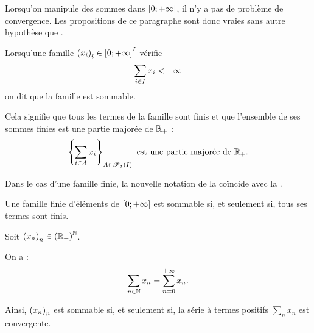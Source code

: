 \begin{rem}
Lorsqu'on manipule des sommes dans \(\left[0;+\infty\right]\), il n'y a pas de problème de convergence. Les propositions de ce paragraphe sont donc vraies sans autre hypothèse que .

Lorsqu'une famille \(\left(x_i\right)_i\in\left[0;+\infty\right]^I\) vérifie \[\sum_{i\in I}x_i<+\infty\] on dit que la famille est sommable.

Cela signifie que tous les termes de la famille sont finis et que l'ensemble de ses sommes finies est une partie majorée de \(\mathbb{R}_+\) : \[\left\lbrace\sum_{i\in A}x_i\right\rbrace_{A\in\mathscr{P}_f\left(I\right)}\text{ est une partie majorée de }\mathbb{R}_+.\]
\end{rem}

\begin{ex}
Dans le cas d'une famille finie, la nouvelle notation de la  coïncide avec la .

Une famille finie d'éléments de \(\left[0;+\infty\right]\) est sommable si, et seulement si, tous ses termes sont finis.
\end{ex}

\begin{ex}
Soit \(\left(x_n\right)_n\in\left(\mathbb{R}_+\right)^{\mathbb{N}}\).

On a : \[\sum_{n\in\mathbb{N}}x_n=\sum_{n=0}^{+\infty}x_n.\]

Ainsi, \(\left(x_n\right)_n\) est sommable si, et seulement si, la série à termes positifs \(\sum_nx_n\) est convergente.
\end{ex}

